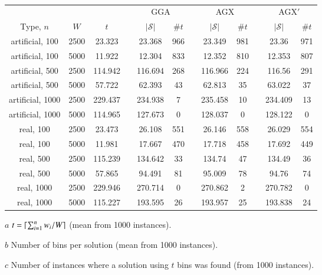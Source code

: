 \documentclass[authoryear]{elsarticle}
\begin{document}
\begin{table}[h!]
\centering
\caption{}
\begin{threeparttable}
\begin{tabular}{c@{\hspace{20pt}}c@{\hspace{20pt}}ccc@{\hspace{15pt}}c@{\hspace{10pt}}cc@{\hspace{15pt}}c@{\hspace{10pt}}cc@{\hspace{15pt}}c@{\hspace{10pt}}}\toprule
	& & & \phantom{a} & \multicolumn{2}{c}{GGA} &\phantom{ab}& \multicolumn{2}{c}{AGX} &\phantom{ab}& \multicolumn{2}{c}{AGX$'$}\\
	\cmidrule{5-6} \cmidrule{8-9} \cmidrule{11-12}
	Type, $n$& $W$ & $t$\tnote{$a$} && $|\mathcal{S}|$\tnote{$b$} & $\# t$\tnote{$c$} && $|\mathcal{S}|$ & $\# t$ && $|\mathcal{S}|$ & $\# t$\\ \midrule \midrule
	artificial, 100 & 2500 & 23.323 && 23.368 & 966 && 23.349 & 981 && 23.36 & 971 \\
	artificial, 100 & 5000 & 11.922 && 12.304 & 833 && 12.352 & 810 && 12.353 & 807 \\
	\midrule
	artificial, 500 & 2500 & 114.942 && 116.694 & 268 && 116.966 & 224 && 116.56 & 291 \\
	artificial, 500 & 5000 & 57.722 && 62.393 & 43 && 62.813 & 35 && 63.022 & 37 \\
	\midrule
	artificial, 1000 & 2500 & 229.437 && 234.938 & 7 && 235.458 & 10 && 234.409 & 13 \\
	artificial, 1000 & 5000 & 114.965 && 127.673 & 0 && 128.037 & 0 && 128.122 & 0 \\
	\midrule \midrule
	real, 100 & 2500 & 23.473 && 26.108 & 551 && 26.146 & 558 && 26.029 & 554 \\
	real, 100 & 5000 & 11.981 && 17.667 & 470 && 17.718 & 458 && 17.692 & 449 \\
	\midrule
	real, 500 & 2500 & 115.239 && 134.642 & 33 && 134.74 & 47 && 134.49 & 36 \\
	real, 500 & 5000 & 57.865 && 94.491 & 81 && 95.009 & 78 && 94.76 & 74 \\
	\midrule
	real, 1000 & 2500 & 229.946 && 270.714 & 0 && 270.862 & 2 && 270.782 & 0 \\
	real, 1000 & 5000 & 115.227 && 193.595 & 26 && 193.957 & 25 && 193.838 & 24 \\
	\bottomrule
\end{tabular}	
\vspace{0.2cm} %
\begin{tablenotes}
	\item[$a$] $t = \lceil\sum_{i=1}^{n} w_i / W\rceil$ (mean from 1000 instances).
	\item[$b$] Number of bins per solution (mean from 1000 instances).
	\item[$c$] Number of instances where a solution using $t$ bins was found (from 1000 instances).
\end{tablenotes}
\end{threeparttable}
\label{table:ea}
\end{table}
\end{document}
